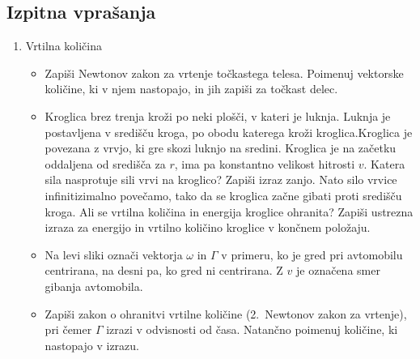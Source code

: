 \newpage
\subsection*{Izpitna vprašanja}
\begin{enumerate}
    \item Vrtilna količina
    \begin{itemize}
        \item Zapiši Newtonov zakon za vrtenje točkastega telesa. Poimenuj vektorske količine, ki v njem nastopajo, in jih zapiši za točkast delec.
        \item Kroglica brez trenja kroži po neki plošči, v kateri je luknja. Luknja je postavljena v središču kroga, po obodu katerega kroži kroglica.Kroglica je povezana z vrvjo, ki gre skozi luknjo na sredini. Kroglica je na začetku oddaljena od središča za \(r\), ima pa konstantno velikost hitrosti \(v\). Katera sila nasprotuje sili vrvi na kroglico? Zapiši izraz zanjo. Nato silo vrvice infinitizimalno povečamo, tako da se kroglica začne gibati proti središču kroga. Ali se vrtilna količina in energija kroglice ohranita? Zapiši ustrezna izraza za energijo in vrtilno količino kroglice v končnem položaju.
        \item Na levi sliki označi vektorja \(\omega\) in \(\Gamma\) v primeru, ko je gred pri avtomobilu centrirana, na desni pa, ko gred ni centrirana. Z \(v\) je označena smer gibanja avtomobila.
        \item Zapiši zakon o ohranitvi vrtilne količine (2.\ Newtonov zakon za vrtenje), pri čemer \(\Gamma\) izrazi v odvisnosti od časa. Natančno poimenuj količine, ki nastopajo v izrazu.
    \end{itemize}
\end{enumerate}